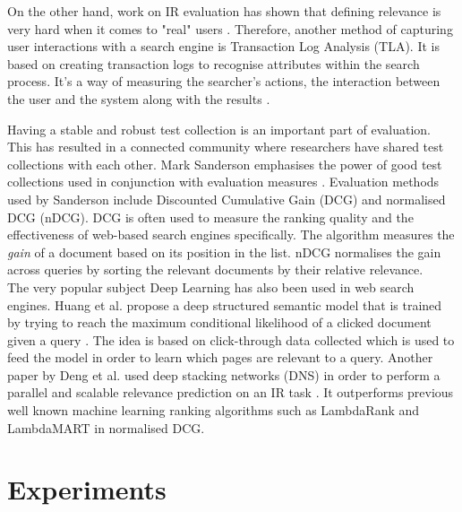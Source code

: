 On the other hand, work on IR evaluation has shown that defining relevance is very hard when it comes to "real" users \cite{mizzaro1997relevance}. Therefore, another method of capturing user interactions with a search engine is Transaction Log Analysis (TLA). It is based on creating transaction logs to recognise attributes within the search process. It's a way of measuring the searcher's actions, the interaction between the user and the system along with the results \cite{glaser1967discovery}. 

Having a stable and robust test collection is an important part of evaluation. This has resulted in a connected community where researchers have shared test collections with each other. Mark Sanderson emphasises the power of good test collections used in conjunction with evaluation measures \cite{sanderson:evaluation}. Evaluation methods used by Sanderson include Discounted Cumulative Gain (DCG) and normalised DCG (nDCG). DCG is often used to measure the ranking quality and the effectiveness of web-based search engines specifically. The algorithm measures the \textit{gain} of a document based on its position in the list. nDCG normalises the gain across queries by sorting the relevant documents by their relative relevance. \\

The very popular subject Deep Learning has also been used in web search engines. Huang et al. propose a deep structured semantic model that is trained by trying to reach the maximum conditional likelihood of a clicked document given a query \cite{huang2013learning}. The idea is based on click-through data collected which is used to feed the model in order to learn which pages are relevant to a query. Another paper by Deng et al. used deep stacking networks (DNS) in order to perform a parallel and scalable relevance prediction on an IR task \cite{deng2013deep}. It outperforms previous well known machine learning ranking algorithms such as LambdaRank and LambdaMART \cite{burges2010ranknet} in normalised DCG. 





\section{Experiments} %
\label{sec:experiment}

